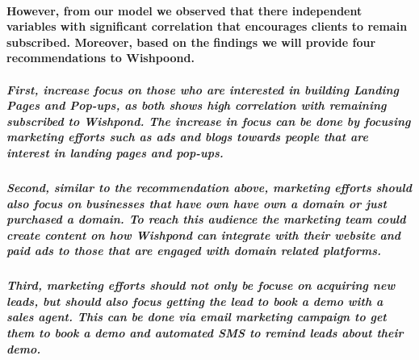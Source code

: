 \documentclass[]{article}
\let\oldparagraph\paragraph
\renewcommand{\paragraph}[1]{\oldparagraph{#1}\mbox{}}
\let\oldsubparagraph\subparagraph
\renewcommand{\subparagraph}[1]{\oldsubparagraph{#1}\mbox{}}
\begin{document}
\paragraph{However, from our model we observed that there independent
variables with significant correlation that encourages clients to remain
subscribed. Moreover, based on the findings we will provide four
recommendations to
Wishpoond.}\label{however-from-our-model-we-observed-that-there-independent-variables-with-significant-correlation-that-encourages-clients-to-remain-subscribed.-moreover-based-on-the-findings-we-will-provide-four-recommendations-to-wishpoond.}

\subparagraph{First, increase focus on those who are interested in
building Landing Pages and Pop-ups, as both shows high correlation with
remaining subscribed to Wishpond. The increase in focus can be done by
focusing marketing efforts such as ads and blogs towards people that are
interest in landing pages and
pop-ups.}\label{first-increase-focus-on-those-who-are-interested-in-building-landing-pages-and-pop-ups-as-both-shows-high-correlation-with-remaining-subscribed-to-wishpond.-the-increase-in-focus-can-be-done-by-focusing-marketing-efforts-such-as-ads-and-blogs-towards-people-that-are-interest-in-landing-pages-and-pop-ups.}

\subparagraph{Second, similar to the recommendation above, marketing
efforts should also focus on businesses that have own have own a domain
or just purchased a domain. To reach this audience the marketing team
could create content on how Wishpond can integrate with their website
and paid ads to those that are engaged with domain related
platforms.}\label{second-similar-to-the-recommendation-above-marketing-efforts-should-also-focus-on-businesses-that-have-own-have-own-a-domain-or-just-purchased-a-domain.-to-reach-this-audience-the-marketing-team-could-create-content-on-how-wishpond-can-integrate-with-their-website-and-paid-ads-to-those-that-are-engaged-with-domain-related-platforms.}

\subparagraph{Third, marketing efforts should not only be focuse on
acquiring new leads, but should also focus getting the lead to book a
demo with a sales agent. This can be done via email marketing campaign
to get them to book a demo and automated SMS to remind leads about their
demo.}\label{third-marketing-efforts-should-not-only-be-focuse-on-acquiring-new-leads-but-should-also-focus-getting-the-lead-to-book-a-demo-with-a-sales-agent.-this-can-be-done-via-email-marketing-campaign-to-get-them-to-book-a-demo-and-automated-sms-to-remind-leads-about-their-demo.}
\end{document}
